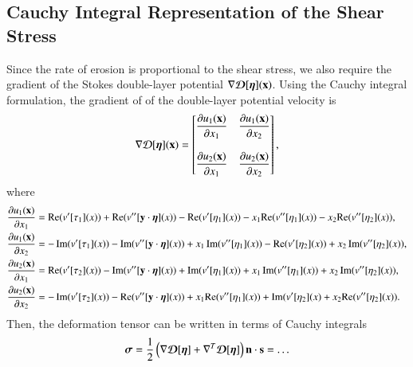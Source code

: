 \documentclass[preprint, 10pt]{elsarticle}
\newcommand{\D}{\mbox{${\mathcal D}$}}
\begin{document}
\subsection{Cauchy Integral Representation of the Shear Stress}
Since the rate of erosion is proportional to the shear stress, we also
require the gradient of the Stokes double-layer potential $\nabla
{\boldsymbol{\mathcal D}}[{\boldsymbol\eta}]({\mathbf{x}})$.  Using the Cauchy integral formulation, the gradient
of of the double-layer potential velocity is
{\color{red}
\begin{align}
 \nabla\D[\eeta] (\xx)=
\left[
\begin{matrix}
\displaystyle\frac{\partial u_1(\xx)}{\partial x_1} & 
\displaystyle\frac{\partial u_1(\xx)}{\partial x_2}\\ \\
\displaystyle\frac{\partial u_2(\xx)}{\partial x_1} & 
\displaystyle\frac{\partial u_2(\xx)}{\partial x_2}
\end{matrix}
\right],
\end{align}
where 
\begin{align}
\frac{\partial u_1({\mathbf{x}})}{\partial x_1}&= {\mathrm{Re}} (v'[\tau_1](x)) + {\mathrm{Re}} (v''[{\mathbf{y}}\cdot{\boldsymbol\eta}](x)) 
           -{\mathrm{Re}} (v'[\eta_1](x)) -x_1{\mathrm{Re}} (v''[\eta_1](x))-x_2{\mathrm{Re}} (v''[\eta_2](x)),\\
\frac{\partial u_1({\mathbf{x}})}{\partial x_2}&= - \operatorname{Im} (v'[\tau_1](x)) 
      - \operatorname{Im} (v''[{\mathbf{y}}\cdot{\boldsymbol\eta}](x)) 
       +x_1\operatorname{Im} (v''[\eta_1](x)) 
       -{\mathrm{Re}} (v'[\eta_2](x))
      +x_2\operatorname{Im} (v''[\eta_2](x)),\\
\frac{\partial u_2({\mathbf{x}})}{\partial x_1}&= {\mathrm{Re}} (v'[\tau_2](x)) 
      -\operatorname{Im} (v''[{\mathbf{y}}\cdot{\boldsymbol\eta}](x)) 
       +\operatorname{Im} (v'[\eta_1](x))
       +x_1\operatorname{Im} (v''[\eta_1](x)) 
      +x_2\operatorname{Im} (v''[\eta_2](x)),\\
\frac{\partial u_2({\mathbf{x}})}{\partial x_2}&= -\operatorname{Im} (v'[\tau_2](x)) 
      -{\mathrm{Re}} (v''[{\mathbf{y}}\cdot{\boldsymbol\eta}](x)) 
       +x_1{\mathrm{Re}} (v''[\eta_1](x)) 
      +\operatorname{Im} (v'[\eta_2](x)
      +x_2{\mathrm{Re}} (v''[\eta_2](x)).
\end{align}
}
Then, the deformation tensor can be written in terms of Cauchy integrals
\begin{align}
  {\boldsymbol\sigma} = \frac{1}{2} 
    \left(\nabla {\boldsymbol{\mathcal D}}[{\boldsymbol\eta}] + \nabla^T {\boldsymbol{\mathcal D}}[{\boldsymbol\eta}] \right) 
      {\mathbf{n}} \cdot {\mathbf{s}} = \ldots
\end{align}
\end{document}
